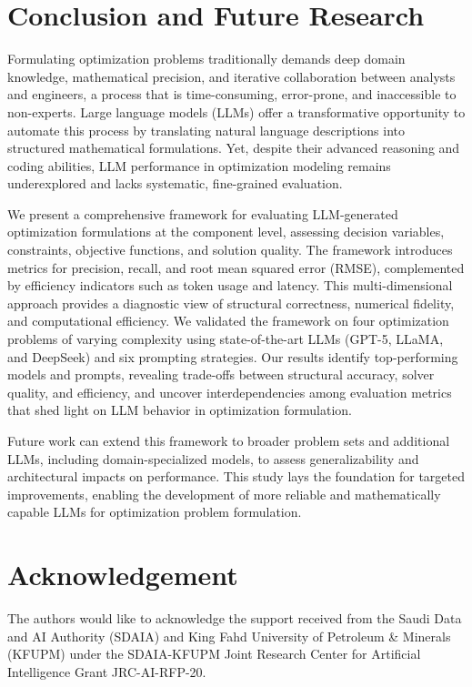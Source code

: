 \documentclass[review,12pt]{elsarticle}
\begin{document}

\section{Conclusion and Future Research}\label{sec:Conclusion}

Formulating optimization problems traditionally demands deep domain knowledge, mathematical precision, and iterative collaboration between analysts and engineers, a process that is time-consuming, error-prone, and inaccessible to non-experts. Large language models (LLMs) offer a transformative opportunity to automate this process by translating natural language descriptions into structured mathematical formulations. Yet, despite their advanced reasoning and coding abilities, LLM performance in optimization modeling remains underexplored and lacks systematic, fine-grained evaluation.

We present a comprehensive framework for evaluating LLM-generated optimization formulations at the component level, assessing decision variables, constraints, objective functions, and solution quality. The framework introduces metrics for precision, recall, and root mean squared error (RMSE), complemented by efficiency indicators such as token usage and latency. This multi-dimensional approach provides a diagnostic view of structural correctness, numerical fidelity, and computational efficiency. We validated the framework on four optimization problems of varying complexity using state-of-the-art LLMs (GPT-5, LLaMA, and DeepSeek) and six prompting strategies. Our results identify top-performing models and prompts, revealing trade-offs between structural accuracy, solver quality, and efficiency, and uncover interdependencies among evaluation metrics that shed light on LLM behavior in optimization formulation.

Future work can extend this framework to broader problem sets and additional LLMs, including domain-specialized models, to assess generalizability and architectural impacts on performance. This study lays the foundation for targeted improvements, enabling the development of more reliable and mathematically capable LLMs for optimization problem formulation.



\section*{Acknowledgement}
The authors would like to acknowledge the support received from the Saudi Data and AI Authority (SDAIA) and King Fahd University of Petroleum \& Minerals (KFUPM) under the SDAIA-KFUPM Joint Research Center for Artificial Intelligence Grant JRC-AI-RFP-20. 
\newpage
\appendix
\end{document}
